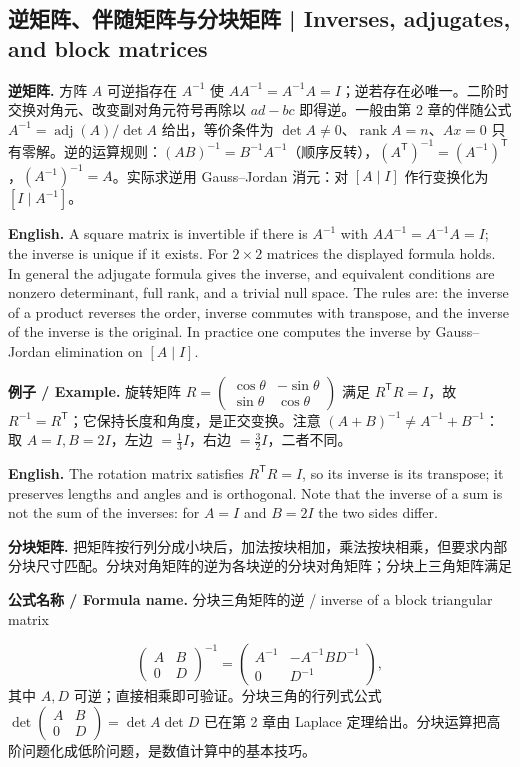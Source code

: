 \documentclass[UTF8,11pt,a4paper]{ctexart}
\newcommand{\EN}[1]{\par\noindent\textbf{English.} #1\par}
\newcommand{\FORMULA}[2]{\par\noindent\textbf{公式名称 / Formula name.} #1 / #2\par}
\newcommand{\EX}[2]{\par\noindent\textbf{例子 / Example.} #1\par\EN{#2}}
\begin{document}
\subsection{逆矩阵、伴随矩阵与分块矩阵 | Inverses, adjugates, and block matrices}
\noindent\textbf{逆矩阵.} 方阵 $A$ 可逆指存在 $A^{-1}$ 使 $AA^{-1}=A^{-1}A=I$；逆若存在必唯一。二阶时交换对角元、改变副对角元符号再除以 $ad-bc$ 即得逆。一般由第 2 章的伴随公式 $A^{-1}=\operatorname{adj}(A)/\det A$ 给出，等价条件为 $\det A\ne0$、$\operatorname{rank}A=n$、$Ax=0$ 只有零解。逆的运算规则：$(AB)^{-1}=B^{-1}A^{-1}$（顺序反转），$(A^{\mathsf T})^{-1}=(A^{-1})^{\mathsf T}$，$(A^{-1})^{-1}=A$。实际求逆用 Gauss--Jordan 消元：对 $[A\mid I]$ 作行变换化为 $[I\mid A^{-1}]$。
\EN{A square matrix is invertible if there is $A^{-1}$ with $AA^{-1}=A^{-1}A=I$; the inverse is unique if it exists. For $2\times2$ matrices the displayed formula holds. In general the adjugate formula gives the inverse, and equivalent conditions are nonzero determinant, full rank, and a trivial null space. The rules are: the inverse of a product reverses the order, inverse commutes with transpose, and the inverse of the inverse is the original. In practice one computes the inverse by Gauss--Jordan elimination on $[A\mid I]$.}
\EX{旋转矩阵 $R=\begin{pmatrix}\cos\theta&-\sin\theta\\\sin\theta&\cos\theta\end{pmatrix}$ 满足 $R^{\mathsf T}R=I$，故 $R^{-1}=R^{\mathsf T}$；它保持长度和角度，是正交变换。注意 $(A+B)^{-1}\ne A^{-1}+B^{-1}$：取 $A=I,B=2I$，左边 $=\frac13I$，右边 $=\frac32I$，二者不同。}{The rotation matrix satisfies $R^{\mathsf T}R=I$, so its inverse is its transpose; it preserves lengths and angles and is orthogonal. Note that the inverse of a sum is not the sum of the inverses: for $A=I$ and $B=2I$ the two sides differ.}
\noindent\textbf{分块矩阵.} 把矩阵按行列分成小块后，加法按块相加，乘法按块相乘，但要求内部分块尺寸匹配。分块对角矩阵的逆为各块逆的分块对角矩阵；分块上三角矩阵满足
\FORMULA{分块三角矩阵的逆}{inverse of a block triangular matrix}
\[
\begin{pmatrix}A&B\\0&D\end{pmatrix}^{-1}=
\begin{pmatrix}A^{-1}&-A^{-1}BD^{-1}\\0&D^{-1}\end{pmatrix},
\]
其中 $A,D$ 可逆；直接相乘即可验证。分块三角的行列式公式 $\det\begin{pmatrix}A&B\\0&D\end{pmatrix}=\det A\det D$ 已在第 2 章由 Laplace 定理给出。分块运算把高阶问题化成低阶问题，是数值计算中的基本技巧。
\end{document}
